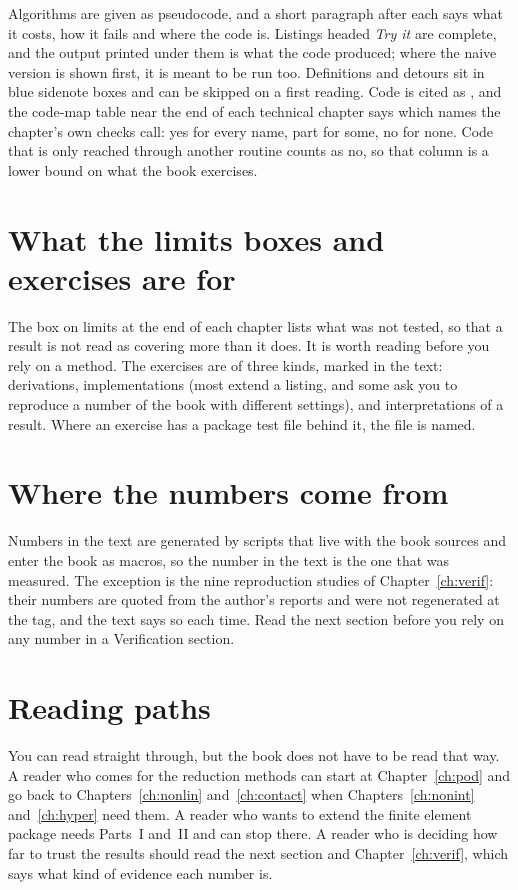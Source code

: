 \documentclass[11pt,a4paper,twoside,openany]{book}
\begin{document}
Algorithms are given as pseudocode, and a short paragraph after each says what it costs, how it fails and where the code is. Listings headed \emph{Try it} are complete, and the output printed under them is what the code produced; where the naive version is shown first, it is meant to be run too. Definitions and detours sit in blue sidenote boxes and can be skipped on a first reading. Code is cited as , and the code-map table near the end of each technical chapter says which names the chapter's own checks call: yes for every name, part for some, no for none. Code that is only reached through another routine counts as no, so that column is a lower bound on what the book exercises.

\section*{What the limits boxes and exercises are for}

The box on limits at the end of each chapter lists what was not tested, so that a result is not read as covering more than it does. It is worth reading before you rely on a method. The exercises are of three kinds, marked in the text: derivations, implementations (most extend a listing, and some ask you to reproduce a number of the book with different settings), and interpretations of a result. Where an exercise has a package test file behind it, the file is named.

\section*{Where the numbers come from}

Numbers in the text are generated by scripts that live with the book sources and enter the book as macros, so the number in the text is the one that was measured. The exception is the nine reproduction studies of Chapter~\ref{ch:verif}: their numbers are quoted from the author's reports and were not regenerated at the tag, and the text says so each time. Read the next section before you rely on any number in a Verification section.

\section*{Reading paths}

You can read straight through, but the book does not have to be read that way. A reader who comes for the reduction methods can start at Chapter~\ref{ch:pod} and go back to Chapters~\ref{ch:nonlin} and~\ref{ch:contact} when Chapters~\ref{ch:nonint} and~\ref{ch:hyper} need them. A reader who wants to extend the finite element package needs Parts~I and~II and can stop there. A reader who is deciding how far to trust the results should read the next section and Chapter~\ref{ch:verif}, which says what kind of evidence each number is.
\end{document}
